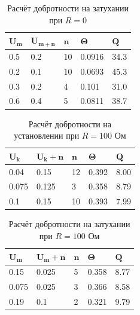 \documentclass{lab}
\begin{document}
\begin{table}[h!]
    \centering
    \begin{tabular}{|l|l|l|l|l|}
        \hline
        $\mathbf{U_m}$ & $\mathbf{U_{m+n}}$ & $\mathbf{n}$ & $\mathbf{\Theta}$ & $\mathbf{Q}$ \\ \hline
        0.5            & 0.2              & 10           & 0.0916            & 34.3         \\ \hline
        0.2            & 0.1              & 10           & 0.0693            & 45.3         \\ \hline
        0.3            & 0.2              & 4            & 0.101             & 31.0         \\ \hline
        0.6            & 0.4              & 5            & 0.0811            & 38.7         \\ \hline
    \end{tabular}
    \caption{Расчёт добротности на затухании при $R=0$}
\end{table}

\begin{table}[h!]
    \centering
    \begin{tabular}{|l|l|l|l|l|}
        \hline
        $\mathbf{U_k}$ & $\mathbf{U_k+n}$ & $\mathbf{n}$ & $\mathbf{\Theta}$ & $\mathbf{Q}$ \\ \hline
        0.04           & 0.15             & 12           & 0.392             & 8.00         \\ \hline
        0.075          & 0.125            & 3            & 0.358             & 8.79         \\ \hline
        0.1            & 0.15             & 10           & 0.393             & 7.99         \\ \hline
    \end{tabular}
    \caption{Расчёт добротности на установлении при $R=100$ Ом}
\end{table}

\begin{table}[h!]
    \centering
    \begin{tabular}{|l|l|l|l|l|}
        \hline
        $\mathbf{U_m}$ & $\mathbf{U_m+n}$ & $\mathbf{n}$ & $\mathbf{\Theta}$ & $\mathbf{Q}$ \\ \hline
        0.15           & 0.025            & 5            & 0.358             & 8.77         \\ \hline
        0.075          & 0.025            & 3            & 0.366             & 8.58         \\ \hline
        0.19           & 0.1              & 2            & 0.321             & 9.79         \\ \hline
    \end{tabular}
    \caption{Расчёт добротности на затухании при $R=100$ Ом}
\end{table}
\end{document}

